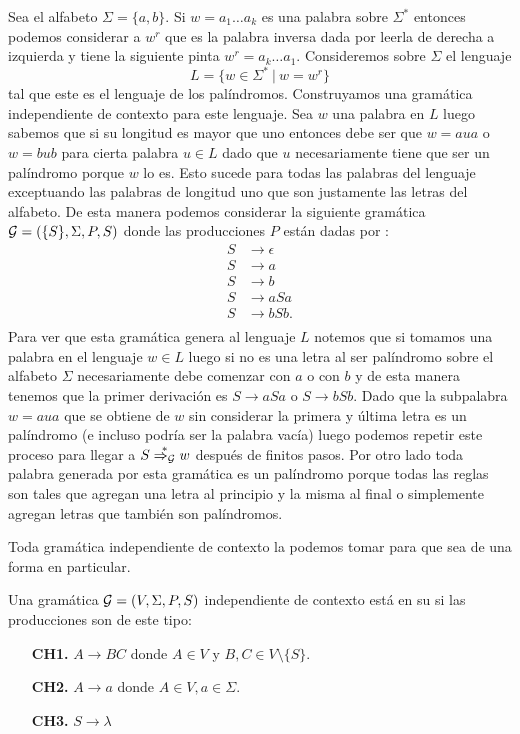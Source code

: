 \documentclass[tesis.tex]{subfiles}
\begin{document}
\begin{ej}
	Sea el alfabeto $\Sigma = \{ a,b \}$. Si $w=a_1 \dots a_k$ es una palabra sobre $\Sigma^*$ entonces podemos considerar a $w^r$ que es la palabra inversa dada por leerla de derecha a izquierda y tiene la siguiente pinta $w^r= a_k \dots a_1$. 
	Consideremos sobre $\Sigma$ el lenguaje 
	\[
	L = \{ w \in \Sigma^* \ | \ w = w^r  \}
	\]
	 tal que este es el lenguaje de los palíndromos. 
	Construyamos una gramática independiente de contexto para este lenguaje.
	Sea $w$ una palabra en $L$ luego sabemos que si su longitud es mayor que uno entonces debe ser que $w = a u a$ o $w = b u b$ para cierta palabra $u \in L$ dado que $u$ necesariamente tiene que ser un palíndromo porque $w$ lo es. 
	Esto sucede para todas las palabras del lenguaje exceptuando las palabras de longitud uno que son justamente las letras del alfabeto. 
	De esta manera podemos considerar la siguiente gramática ${\cal G}  =  (\{S\}, \Sigma, P, S )$ donde las producciones $P$ están dadas por :
	\begin{align*}
	S  & \to \epsilon \\ S &\to a \\ S &\to b \\ S &\to  aSa \\ S &\to bSb. \\
	\end{align*}
	Para ver que esta gramática genera al lenguaje $L$ notemos que si tomamos una palabra en el lenguaje $w \in L$ luego si no es una letra al ser palíndromo sobre el alfabeto $\Sigma$ necesariamente debe comenzar con $a$ o con $b$ y de esta manera tenemos que la primer derivación es $S \to aSa$ o $S \to bSb$. 
	Dado que la subpalabra $w = aua$ que se obtiene de $w$ sin considerar la primera y última letra es un palíndromo (e incluso podría ser la palabra vacía) luego podemos repetir este proceso para llegar a $S \overset{*}{\Rightarrow_{\cal G}} w$ después de finitos pasos. 
	Por otro lado toda palabra generada por esta gramática es un palíndromo porque todas las reglas son tales que agregan una letra al principio y la misma al final o simplemente agregan letras que también son palíndromos.
	
\end{ej}

Toda gramática independiente de contexto la podemos tomar para que sea de una forma en particular.

\begin{deff}
	Una gramática ${\cal G} = (V, \Sigma, P, S)$ independiente de contexto está en su  si las producciones son de este tipo:
	\begin{enumerate}
		\item[\textbf{CH1.}] $A \to BC$ donde $A\in V$ y $B,C \in V \setminus \{ S \}$.
		\item[\textbf{CH2.}] $A \to a$ donde $A \in V, a \in \Sigma$.
		\item[\textbf{CH3.}] $S \to \lambda$ 
	\end{enumerate}
\end{deff}
\end{document}

